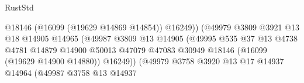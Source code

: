 \begin{lexlean}{RustStd}
\begin{coremodule}
                                                          @18146
                                                          (@16099 (@19629 @14869 @14854))
                                                          @16249))
                                                      (@49979
                                                        @3809
                                                        @3921
                                                        @13
                                                        @18
                                                        @14905
                                                        @14965
                                                        (@49987
                                                          @3809
                                                          @13
                                                          @14905
                                                          (@49995
                                                            @535
                                                            @37
                                                            @13
                                                            @4738
                                                            @4781
                                                            @14879
                                                            @14900
                                                            @50013
                                                            @47079
                                                            @47083
                                                            @30949
                                                            @18146
                                                            (@16099 (@19629 @14900 @14880))
                                                            @16249))
                                                        (@49979
                                                          @3758
                                                          @3920
                                                          @13
                                                          @17
                                                          @14937
                                                          @14964
                                                          (@49987
                                                            @3758
                                                            @13
                                                            @14937

\end{coremodule}
\end{lexlean}
